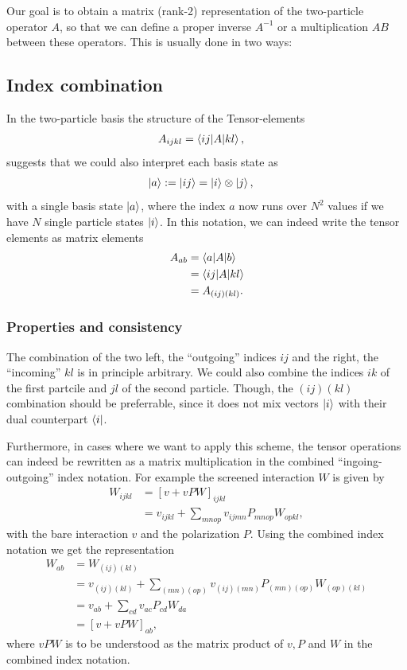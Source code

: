 \documentclass[12pt,a4paper]{scrartcl}
\numberwithin{equation}{section}
\begin{document}
Our goal is to obtain a matrix (rank-2) representation of the two-particle operator $A$, so that we can 
define a proper inverse $A^{-1}$ or a multiplication $AB$ between these operators. 
This is usually done in two ways:

\subsection{Index combination}
In the two-particle basis the structure of the Tensor-elements
\begin{align}
 A_{ijkl} &= \braket{ij | A | kl } ,
\end{align}
suggests that we could also interpret each basis state as
\begin{align}
 \ket{a} := \ket{ ij } &= \ket{i}\otimes \ket{j} ,
\end{align}
with a single basis state $\ket{a}$, where the index $a$ now runs over $N^2$ values
if we have $N$ single particle states $\ket{i}$. In this notation, we can indeed write the tensor elements
as matrix elements
\begin{align}
 A_{ab} &= \braket{a | A | b } \\
 &= \braket{ij | A | kl }   \\
  &= A_{(ij)(kl)} .
\end{align}

\subsubsection{Properties and consistency}

The combination of the two left, the ``outgoing'' indices $ij$ and the right, the ``incoming'' $kl$ is in principle arbitrary.
We could also combine the indices $ik$ of the first partcile and $jl$ of the second particle. 
Though, the $(ij)(kl)$ combination should be preferrable, since it does not mix vectors $\ket{i}$ with their
dual counterpart $\bra{i}$. 

Furthermore, in cases where we want to apply this scheme, the tensor operations can indeed be rewritten
as a matrix multiplication in the combined ``ingoing-outgoing'' index notation. For example
the screened interaction $W$ is given by
\begin{align}
W_{ijkl} &= [ v + vPW ]_{ijkl} \\
&= v_{ijkl} + \sum_{mnop} v_{ijmn}P_{mnop}W_{opkl},
\end{align}
with the bare interaction $v$ and the polarization $P$. Using the combined index notation we get the representation
\begin{align}
W_{ab} &= W_{(ij)(kl)} \\
&= v_{(ij)(kl)} + \sum_{(mn)(op)} v_{(ij)(mn)}P_{(mn)(op)}W_{(op)(kl)} \\
&= v_{ab} + \sum_{cd} v_{ac}P_{cd}W_{da} \\
&= [v + vPW]_{ab},
\end{align}
where $vPW$ is to be understood as the matrix product of $v,P$ and $W$ in the combined index notation.
\end{document}
